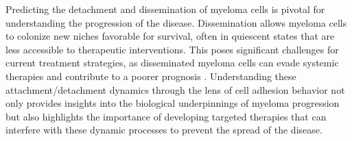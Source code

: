 Predicting the detachment and dissemination of myeloma cells is pivotal for
understanding the progression of the disease. Dissemination allows myeloma cells
to colonize new niches favorable for survival, often in quiescent states that
are less accessible to therapeutic interventions. This poses significant
challenges for current treatment strategies, as disseminated myeloma cells can
evade systemic therapies and contribute to a poorer prognosis
\cite{forsterMolecularImpactTumor2022,
      keatsClonalCompetitionAlternating2012}. Understanding these attachment/detachment
dynamics through the lens of cell adhesion behavior not only provides insights
into the biological underpinnings of myeloma progression but also highlights the
importance of developing targeted therapies that can interfere with these
dynamic processes to prevent the spread of the disease.


